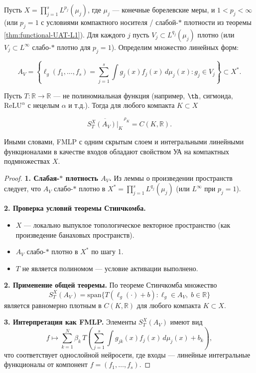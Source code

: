 \documentclass[../NDCNNAI_main.tex]{subfiles}
\begin{document}
\begin{theorem}
\label{thm:main-UAT-FMLP}
Пусть \( X = \prod_{j=1}^s L^{p_j}(\mu_j) \), где \(\mu_j\) --- конечные борелевские меры, и \( 1 < p_j < \infty \) (или \( p_j = 1 \) с условиями компактного носителя / слабой-$\ast$ плотности из теоремы \ref{thm:functional-UAT-L1}).  
Для каждого \( j \) пусть \( V_j \subset L^{q_j}(\mu_j) \) плотно (или \( V_j \subset L^\infty \) слабо-$\ast$ плотно для \( p_j = 1 \)).  
Определим множество линейных форм:

\[
A_V = \left\{ \ell_g(f_1,\dots,f_s) = \sum_{j=1}^s \int g_j(x) f_j(x) \, d\mu_j(x) : g_j \in V_j \right\} \subset X^*.
\]

Пусть \( T\colon \mathbb{R} \to \mathbb{R} \) --- не полиномиальная функция (например, \(\th\), сигмоида, \(\mathrm{ReLU}^\alpha\) с нецелым \(\alpha\) и т.д.).  
Тогда для любого компакта \( K \subset X \)

\[
\overline{S_T^X(A_V)|_K}^{\,\rho_K} = C(K, \mathbb{R}).
\]

Иными словами, FMLP с одним скрытым слоем и интегральными линейными функционалами в качестве входов обладают свойством УА на компактных подмножествах \( X \).
\end{theorem}

\begin{proof}
    \textbf{1. Слабая-$\ast$ плотность \( A_V \).}  
    Из леммы о произведении пространств следует, что \( A_V \) слабо-$\ast$ плотно в \( X^* = \prod_{j=1}^s L^{q_j}(\mu_j) \) (или \( L^\infty \) при \( p_j = 1 \)).

    \textbf{2. Проверка условий теоремы Стинчкомба.}  
    \begin{itemize}
        \item \( X \) --- локально выпуклое топологическое векторное пространство (как произведение банаховых пространств).
        \item \( A_V \) слабо-$\ast$ плотно в \( X^* \) по шагу 1.
        \item \( T \) не является полиномом --- условие активации выполнено.
    \end{itemize}

    \textbf{2. Применение общей теоремы.}  
    По теореме Стинчкомба множество 
    \[
    S_T^X(A_V) = \mathrm{span}\{ T(\ell_g(\cdot) + b) : \ell_g \in A_V, \; b \in \mathbb{R} \}
    \]
    является равномерно плотным в \( C(K, \mathbb{R}) \) для любого компакта \( K \subset X \).

    \textbf{3. Интерпретация как FMLP.}  
    Элементы \( S_T^X(A_V) \) имеют вид
    \[
    f \mapsto \sum_{k=1}^N \beta_k \, T\!\left( \sum_{j=1}^s \int g_{jk}(x) f_j(x) \, d\mu_j(x) + b_k \right),
    \]
    что соответствует однослойной нейросети, где входы --- линейные интегральные функционалы от компонент \( f = (f_1,\dots,f_s) \).
\end{proof}
\end{document}
